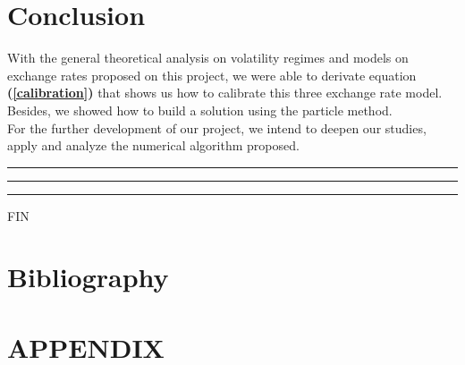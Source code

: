 \documentclass[a4paper, 12pt]{article}
\numberwithin{equation}{subsection}
\begin{document}
\clearpage
\section{Conclusion}
With the general theoretical analysis on volatility regimes and models on exchange rates proposed on this project, we were able to derivate equation \textbf{(\ref{calibration})} that shows us how to calibrate this three exchange rate model. Besides, we showed how to  build a solution using the particle method.\\
For the further development of our project, we intend to deepen our studies, apply and analyze the numerical algorithm proposed.


    \begin{center}
        \color{bleu303}

        \rule{0.3\textwidth}{0.2mm}\vspace*{-3.5mm}

        \rule{0.5\textwidth}{0.6mm}\vspace*{-3.8mm}

        \rule{0.3\textwidth}{0.2mm}\vspace*{-1mm}

        \sffamily FIN
    \end{center}

\clearpage
\section{Bibliography}
{
\renewcommand{\section}[2]{}
\nocite{*}

%
%

}

\pagebreak

\section{APPENDIX}
\end{document}
